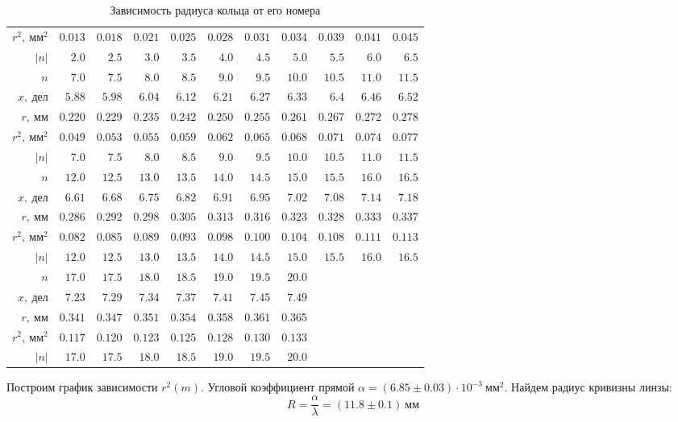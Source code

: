 \documentclass[10pt,a4paper]{article}
\begin{document}
\begin{table}[h]
\begin{tabular}{r|rrrrrrrrrr}
$r^2,\ \text{мм}^2$ & $0.013$  & $0.018$  & $0.021$  & $0.025$  & $0.028$  & $0.031$  & $0.034$  & $0.039$  & $0.041$  & $0.045$\\
$|n|$ & $2.0$  & $2.5$  & $3.0$  & $3.5$  & $4.0$  & $4.5$  & $5.0$  & $5.5$  & $6.0$  & $6.5$\\
\hline
$n$ & $7.0$  & $7.5$  & $8.0$  & $8.5$  & $9.0$  & $9.5$  & $10.0$  & $10.5$  & $11.0$  & $11.5$\\
$x,\ \text{дел}$ & $5.88$  & $5.98$  & $6.04$  & $6.12$  & $6.21$  & $6.27$  & $6.33$  & $6.4$  & $6.46$  & $6.52$\\
$r,\ \text{мм}$ & $0.220$  & $0.229$  & $0.235$  & $0.242$  & $0.250$  & $0.255$  & $0.261$  & $0.267$  & $0.272$  & $0.278$\\
$r^2,\ \text{мм}^2$ & $0.049$  & $0.053$  & $0.055$  & $0.059$  & $0.062$  & $0.065$  & $0.068$  & $0.071$  & $0.074$  & $0.077$\\
$|n|$ & $7.0$  & $7.5$  & $8.0$  & $8.5$  & $9.0$  & $9.5$  & $10.0$  & $10.5$  & $11.0$  & $11.5$\\
\hline
$n$ & $12.0$  & $12.5$  & $13.0$  & $13.5$  & $14.0$  & $14.5$  & $15.0$  & $15.5$  & $16.0$  & $16.5$\\
$x,\ \text{дел}$ & $6.61$  & $6.68$  & $6.75$  & $6.82$  & $6.91$  & $6.95$  & $7.02$  & $7.08$  & $7.14$  & $7.18$\\
$r,\ \text{мм}$ & $0.286$  & $0.292$  & $0.298$  & $0.305$  & $0.313$  & $0.316$  & $0.323$  & $0.328$  & $0.333$  & $0.337$\\
$r^2,\ \text{мм}^2$ & $0.082$  & $0.085$  & $0.089$  & $0.093$  & $0.098$  & $0.100$  & $0.104$  & $0.108$  & $0.111$  & $0.113$\\
$|n|$ & $12.0$  & $12.5$  & $13.0$  & $13.5$  & $14.0$  & $14.5$  & $15.0$  & $15.5$  & $16.0$  & $16.5$\\
\hline
$n$ & $17.0$  & $17.5$  & $18.0$  & $18.5$  & $19.0$  & $19.5$  & $20.0$ &  &  & \\
$x,\ \text{дел}$ & $7.23$  & $7.29$  & $7.34$  & $7.37$  & $7.41$  & $7.45$  & $7.49$ &  &  & \\
$r,\ \text{мм}$ & $0.341$  & $0.347$  & $0.351$  & $0.354$  & $0.358$  & $0.361$  & $0.365$ &  &  & \\
$r^2,\ \text{мм}^2$ & $0.117$  & $0.120$  & $0.123$  & $0.125$  & $0.128$  & $0.130$  & $0.133$ &  &  & \\
$|n|$ & $17.0$  & $17.5$  & $18.0$  & $18.5$  & $19.0$  & $19.5$  & $20.0$ &  &  & \\
\end{tabular}
\caption{Зависимость радиуса кольца от его номера}
\end{table}
Построим график зависимости $r^2(m)$. Угловой коэффициент прямой $\alpha = (6.85\pm0.03)\cdot 10^{-3}\ \text{мм}^2$. Найдем радиус кривизны линзы:
\begin{equation}
R = \dfrac{\alpha}{\lambda} = (11.8\pm0.1)\ \text{мм}
\end{equation}
\end{document}

